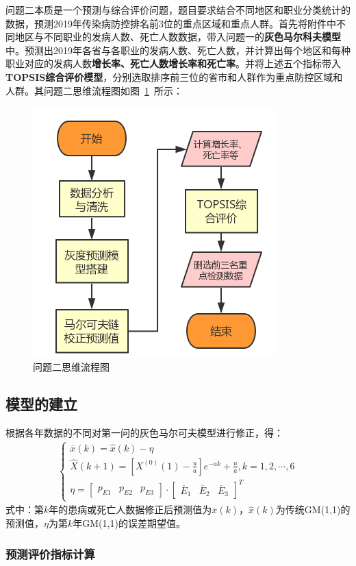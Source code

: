 \documentclass{whutmod}
\begin{document}
	 问题二本质是一个预测与综合评价问题，题目要求结合不同地区和职业分类统计的数据，预测2019年传染病防控排名前3位的重点区域和重点人群。首先将附件中不同地区与不同职业的发病人数、死亡人数数据，带入问题一的\textbf{灰色马尔科夫模型}中。预测出2019年各省与各职业的发病人数、死亡人数，并计算出每个地区和每种职业对应的发病人数\textbf{增长率、死亡人数增长率和死亡率}。并将上述五个指标带入\textbf{TOPSIS综合评价模型}，分别选取排序前三位的省市和人群作为重点防控区域和人群。其问题二思维流程图如图~\ref{lctcc}~所示：
	 \begin{figure}[H]
	 	\centering
	 	\includegraphics[width=.5\textwidth]{figures/lctcc.png}
	 	\caption{问题二思维流程图}\label{lctcc}
	 \end{figure}
	  \subsection{模型的建立}
	  根据各年数据的不同对第一问的灰色马尔可夫模型进行修正，得：
	  \begin{gather}
\left\{\begin{matrix}
\overline{x}(k) =\widehat{x}(k)-\eta\\
\widehat{X}(k+1)=[X^{(0)}(1)-\frac{u}{a}]e^{-ak}+\frac{u}{a},k=1,2,\cdots,6\\ 
\eta =\begin{bmatrix}
p_{E1} & p_{E2} & p_{E3}
\end{bmatrix} \cdot \begin{bmatrix}
\overline{E}_{1} & \overline{E}_{2} & \overline{E}_{3}
\end{bmatrix}^{T}
\end{matrix}\right.
	  \end{gather}
	 式中：第$k$年的患病或死亡人数据修正后预测值为$\overline{x}(k)$，$\widehat{x}(k)$为传统GM(1,1)的预测值，$\eta$为第$k$年GM(1,1)的误差期望值。
	     \subsubsection{预测评价指标计算}
	     
\end{document}
